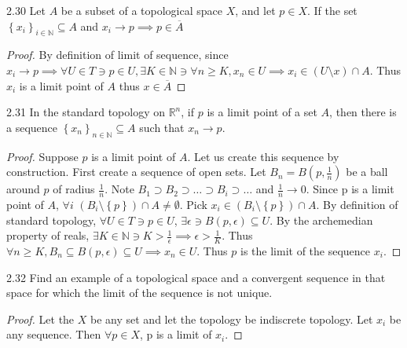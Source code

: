 \documentclass{article}
\newcommand{\R}{\mathbb{R}}
\newcommand{\N}{\mathbb{N}}
\begin{document}
\begin{claim}{2.30}\label{Claim 2.30.}
    Let $A$ be a subset of a topological space $X$, and let $p \in X$. If the set $\left\{ x_i \right\}_{i \in \N} \subseteq A$ and $x_i \to p \implies p \in \overline{A}$     
\end{claim}
\begin{proof}
    By definition of limit of sequence, since $x_i \to p \implies \forall U \in T \ni p \in U, \exists K \in \N \ni \forall n \geq K, x_n \in U \implies x_i \in \left(U \setminus x\right) \cap A$. Thus $x_i$ is a limit point of $A$ thus $x \in \overline{A}$    
\end{proof}

\bigskip

\begin{claim}{2.31}\label{Claim 2.31.}
    In the standard topology on $\R^n$, if $p$ is a limit point of a set $A$, then there is a sequence $\left\{ x_n \right\}_{n \in \N} \subseteq A$ such that $x_n \to p$.     
\end{claim}
\begin{proof}
    Suppose $p$ is a limit point of $A$. Let us create this sequence by construction. First create a sequence of open sets. Let $B_n = B(p, \frac{1}{n})$ be a ball around $p$ of radius $\frac{1}{n}$. Note $B_1 \supset B_2 \supset \dots \supset B_i \supset \dots$ and $\frac{1}{n} \to 0$. Since p is a limit point of $A$, $\forall i$ $\left(B_i \setminus \left\{ p \right\}\right) \cap A \neq \emptyset$. Pick $x_i \in \left(B_i \setminus \left\{ p \right\}\right) \cap A$. By definition of standard topology, $\forall U \in T \ni p \in U$, $\exists \epsilon \ni B(p, \epsilon) \subseteq U$. By the archemedian property of reals, $\exists K \in \N \ni K > \frac{1}{\epsilon} \implies \epsilon > \frac{1}{K}$. Thus $\forall n \geq K, B_n \subseteq B(p, \epsilon) \subseteq U \implies x_n \in U$. Thus $p$ is the limit of the sequence $x_i$.               
\end{proof}

\bigskip

\begin{PROB}{2.32}\label{Problem 2.32.}
    Find an example of a topological space and a convergent sequence in that space for which the limit of the sequence is not unique.
\end{PROB}
\begin{proof}
    Let the $X$ be any set and let the topology be indiscrete topology. Let $x_i$ be any sequence. Then $\forall p \in X$, p is a limit of $x_i$. 
\end{proof}
\end{document}
